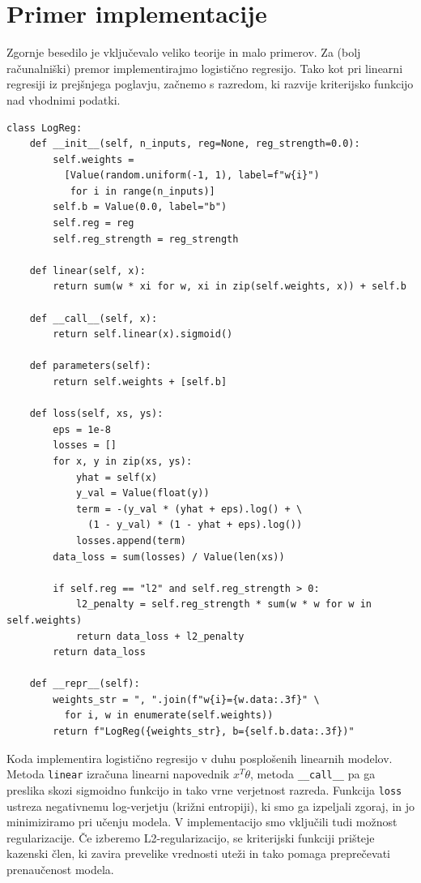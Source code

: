 \section{Primer implementacije}

Zgornje besedilo je vključevalo veliko teorije in malo primerov. Za (bolj računalniški) premor implementirajmo logistično regresijo. Tako kot pri linearni regresiji iz prejšnjega poglavju, začnemo s razredom, ki razvije kriterijsko funkcijo nad vhodnimi podatki.

\vspace*{3mm}
\begin{lstlisting}
class LogReg:
    def __init__(self, n_inputs, reg=None, reg_strength=0.0):
        self.weights = 
          [Value(random.uniform(-1, 1), label=f"w{i}")
           for i in range(n_inputs)]
        self.b = Value(0.0, label="b")
        self.reg = reg
        self.reg_strength = reg_strength

    def linear(self, x):
        return sum(w * xi for w, xi in zip(self.weights, x)) + self.b

    def __call__(self, x):
        return self.linear(x).sigmoid()

    def parameters(self):
        return self.weights + [self.b]

    def loss(self, xs, ys):
        eps = 1e-8
        losses = []
        for x, y in zip(xs, ys):
            yhat = self(x)
            y_val = Value(float(y))
            term = -(y_val * (yhat + eps).log() + \
              (1 - y_val) * (1 - yhat + eps).log())
            losses.append(term)
        data_loss = sum(losses) / Value(len(xs))

        if self.reg == "l2" and self.reg_strength > 0:
            l2_penalty = self.reg_strength * sum(w * w for w in self.weights)
            return data_loss + l2_penalty
        return data_loss

    def __repr__(self):
        weights_str = ", ".join(f"w{i}={w.data:.3f}" \
          for i, w in enumerate(self.weights))
        return f"LogReg({weights_str}, b={self.b.data:.3f})"
\end{lstlisting}

Koda implementira logistično regresijo v duhu posplošenih linearnih modelov.
%
%
Metoda \texttt{linear} izračuna linearni napovednik $x^T\theta$, metoda \texttt{\_\_call\_\_} pa ga preslika skozi sigmoidno funkcijo in tako vrne verjetnost razreda. Funkcija \texttt{loss} ustreza negativnemu log-verjetju (križni entropiji), ki smo ga izpeljali zgoraj, in jo minimiziramo pri učenju modela. V implementacijo smo vključili tudi možnost regularizacije. Če izberemo L2-regularizacijo, se kriterijski funkciji prišteje kazenski člen, ki zavira prevelike vrednosti uteži in tako pomaga preprečevati prenaučenost modela.

